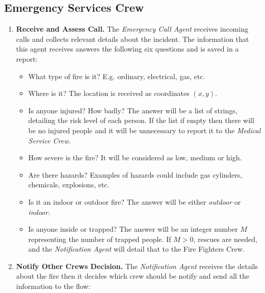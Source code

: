 \subsection{Emergency Services Crew}
\begin{enumerate}

    \item \textbf{Receive and Assess Call.} 
    The \textit{Emergency Call Agent} receives incoming calls and collects relevant details
    about the incident. The information that this agent receives answers the following six questions and is saved
    in a report:
    \begin{itemize}
        \item What type of fire is it? E.g. ordinary, electrical, gas, etc.
        \item Where is it? The location is received as coordinates \((x, y)\).
        \item Is anyone injured? How badly? The answer will be a list of strings, detailing the risk level of each person. If the list 
        if empty then there will be no injured people and it will be unnecessary to report it to the \textit{Medical Service Crew.}
        \item How severe is the fire? It will be considered as low, medium or high.
        \item Are there hazards? Examples of hazards could include gas cylinders, chemicals, explosions, etc.
        \item Is it an indoor or outdoor fire? The answer will be either \textit{outdoor} or \textit{indoor}.
        \item Is anyone inside or trapped? The answer will be an integer number $M$ representing the number of trapped people. 
        If $M > 0$, rescues are needed, and the \textit{Notification Agent} will detail that to the Fire Fighters Crew.
    \end{itemize}
    

    \item \textbf{Notify Other Crews Decision.} 
    The \textit{Notification Agent} receives the details about the fire then it decides which crew should be notify and send
    all the information to the flow:
    

\end{enumerate}
